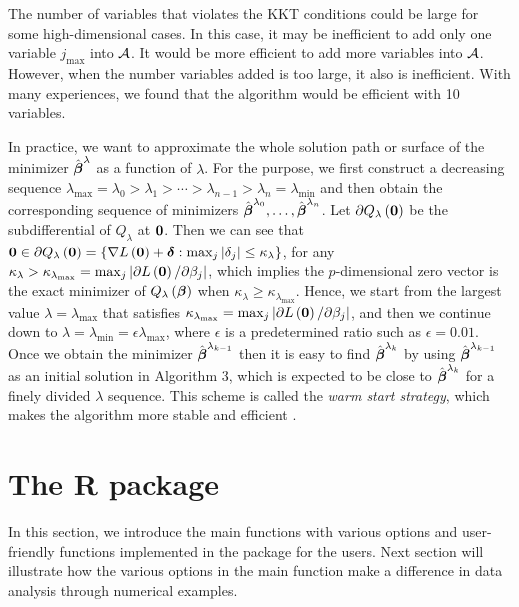 {\remark
The number of variables that violates the KKT conditions could be large for some high-dimensional cases.
In this case, it may be inefficient to add only one variable $j_{\max}$ into ${\cal A}$.
It would be more efficient to add more variables into ${\cal A}$.
However, when the number variables added is too large, it also is inefficient.
With many experiences, we found that the algorithm would be efficient with 10 variables.}

\medskip

In practice, we want to approximate the whole solution path or surface of the minimizer $\hat{\mbox{\boldmath{$\beta$}}}^\lambda$ as a function of $\lambda$.
For the purpose, we first construct a decreasing sequence $\lambda_{\max}=\lambda_0>\lambda_1>\cdots>\lambda_{n-1}>\lambda_n=\lambda_{\min}$
and then obtain the corresponding sequence of minimizers $\hat{\mbox{\boldmath{$\beta$}}}^{\lambda_0},\ldots,\hat{\mbox{\boldmath{$\beta$}}}^{\lambda_n}$.
Let $\partial Q_{\lambda}\left(\mathbf{0}\right)$ be the subdifferential of $Q_{\lambda}$ at $\mathbf{0}$.
Then we can see that $\mathbf{0}\in\partial Q_{\lambda}\left(\mathbf{0}\right)=\{\nabla L\left(\mathbf{0}\right)+\mbox{\boldmath{$\delta$}\unboldmath}:\max_j|\delta_j|\leq \kappa_\lambda\}$,
for any $\kappa_\lambda>\kappa_{\lambda_{\max}}=\max_j|\partial L\left(\mathbf{0}\right)/\partial\beta_j|$,
which implies the $p$-dimensional zero vector is the exact minimizer of $Q_\lambda\left(\mbox{\boldmath{$\beta$}}\right)$ when $\kappa_\lambda\geq\kappa_{\lambda_{\max}}$.
Hence, we start from the largest value $\lambda=\lambda_{\max}$ that satisfies $\kappa_{\lambda_{\max}}=\max_j|\partial L\left(\mathbf{0}\right)/\partial\beta_j|$,
and then we continue down to $\lambda=\lambda_{\min}=\epsilon\lambda_{\max}$, where $\epsilon$ is a predetermined ratio such as $\epsilon=0.01$.
Once we obtain the minimizer $\hat{\mbox{\boldmath{$\beta$}}}^{\lambda_{k-1}}$ then it is easy to find $\hat{\mbox{\boldmath{$\beta$}}}^{\lambda_k}$ by using $\hat{\mbox{\boldmath{$\beta$}}}^{\lambda_{k-1}}$ as an initial solution in Algorithm 3, which is expected to be close to $\hat{\mbox{\boldmath{$\beta$}}}^{\lambda_k}$ for a finely divided $\lambda$ sequence.
This scheme is called the {\em warm start strategy}, which makes the algorithm more stable and efficient \citep{friedman2010regularization}.



\section{The R package }
In this section, we introduce the main functions with various options and user-friendly functions implemented in the package  for the users. Next section will illustrate how the various options in the main function make a difference in data analysis through numerical examples.

